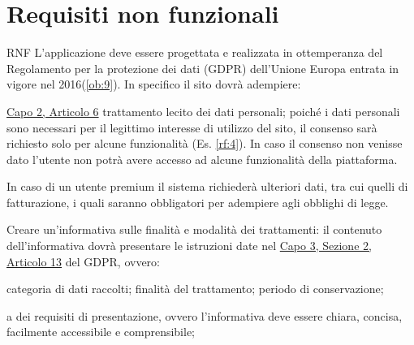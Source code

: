 \section{Requisiti non funzionali}
\label{sec:RequisitiNonFunzionali}

\begin{listaPersonale}{RNF}
     L'applicazione deve essere progettata e realizzata in ottemperanza del Regolamento per la protezione dei dati (GDPR) dell'Unione Europa entrata in vigore nel 2016(\ref{ob:9}). In specifico il sito dovrà adempiere:
    \begin{listaPersonale2}{}
         \href{https://eur-lex.europa.eu/legal-content/IT/TXT/?uri=uriserv:OJ.L_.2016.119.01.0001.01.ITA&toc=OJ:L:2016:119:TOC#d1e1898-1-1}{Capo 2, Articolo 6} trattamento lecito dei dati personali; poiché i dati personali sono necessari per il legittimo interesse di utilizzo del sito, il consenso sarà richiesto solo per alcune funzionalità (Es. \ref{rf:4}). In caso il consenso non venisse dato l'utente non potrà avere accesso ad alcune funzionalità della piattaforma.
        \begin{listaPersonale3}{}
             In caso di un utente premium il sistema richiederà ulteriori dati, tra cui quelli di fatturazione, i quali saranno obbligatori per adempiere agli obblighi di legge.
        \end{listaPersonale3}

         Creare un'informativa sulle finalità e modalità dei trattamenti: il contenuto dell'informativa dovrà presentare le istruzioni date nel \href{https://eur-lex.europa.eu/legal-content/IT/TXT/?uri=uriserv:OJ.L_.2016.119.01.0001.01.ITA&toc=OJ:L:2016:119:TOC#d1e2261-1-1}{Capo 3, Sezione 2, Articolo 13} del GDPR, ovvero:
        \begin{listaPersonale3}{}
             categoria di dati raccolti;
             finalità del trattamento;
             periodo di conservazione;
        \end{listaPersonale3}

         a dei requisiti di presentazione, ovvero l'informativa deve essere chiara, concisa, facilmente accessibile e comprensibile;


\end{listaPersonale2}
\end{listaPersonale}
